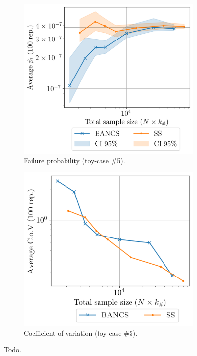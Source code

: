 \begin{figure}
    \begin{subfigure}[b]{0.49\linewidth}
        \centering
        \includegraphics[width=\linewidth]{part3/figures/BANCS/Oscillator_mean.png}
        \caption{Failure probability (toy-case \#5).}
    \end{subfigure}
    \begin{subfigure}[b]{0.47\linewidth}
        \centering
        \includegraphics[width=\linewidth]{part3/figures/BANCS/Oscillator_cov.png}
        \caption{Coefficient of variation (toy-case \#5).}
    \end{subfigure}
    \caption{Todo.}
    \label{fig:bancs_benchmark}
\end{figure}

